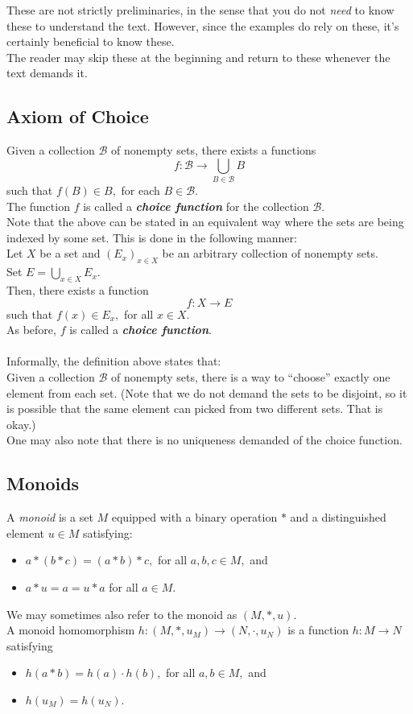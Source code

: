 These are not strictly preliminaries, in the sense that you do not \emph{need} to know these to understand the text. However, since the examples do rely on these, it's certainly beneficial to know these.\\
The reader may skip these at the beginning and return to these whenever the text demands it.
\subsection{Axiom of Choice}
Given a collection $\mathcal{B}$ of nonempty sets, there exists a functions
\begin{equation*} 
	f:\mathcal{B} \to \bigcup_{B \in \mathcal{B}}B
\end{equation*}
such that $f(B) \in B,$ for each $B \in \mathcal{B}.$\\
The function $f$ is called a \emph{\textbf{choice function}} for the collection $\mathcal{B}.$\\
Note that the above can be stated in an equivalent way where the sets are being indexed by some set. This is done in the following manner:\\
Let $X$ be a set and $(E_x)_{x \in X}$ be an arbitrary collection of nonempty sets. \\
Set $E = \displaystyle\bigcup_{x \in X}E_x.$ \\
Then, there exists a function
\begin{equation*} 
 	f : X \to E
\end{equation*}
such that $f(x) \in E_x,$ for all $x \in X.$\\
As before, $f$ is called a \emph{\textbf{choice function}}.\\~\\
Informally, the definition above states that:\\
Given a collection $\mathcal{B}$ of nonempty sets, there is a way to ``choose'' exactly one element from each set. (Note that we do not demand the sets to be disjoint, so it is possible that the same element can picked from two different sets. That is okay.) \\
One may also note that there is no uniqueness demanded of the choice function.
\subsection{Monoids}
A \emph{monoid} is a set $M$ equipped with a binary operation $*$ and a distinguished element $u \in M$ satisfying:
\begin{itemize}
	\item $a*(b*c) = (a*b)*c,$ for all $a, b, c \in M,$ and
	\item $a*u = a = u*a$ for all $a \in M.$
\end{itemize}
We may sometimes also refer to the monoid as $(M, *, u).$\\
A monoid homomorphism $h:(M, *, u_M) \to (N, \cdot, u_N)$ is a function $h:M\to N$ satisfying
\begin{itemize}
	\item $h(a*b) = h(a)\cdot h(b),$ for all $a, b \in M,$ and
	\item $h(u_M) = h(u_N).$
\end{itemize}
